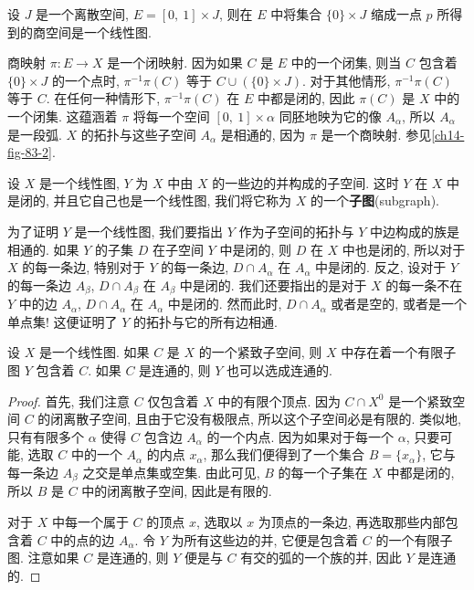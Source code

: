 \begin{example}[无限星是线性图]
\label{example:ch14-infinite-star}
设 $J$ 是一个离散空间, $E=[0,\ 1]\times J$, 则在 $E$ 中将集合 $\{0\}\times J$ 缩成一点 $p$ 所得到的商空间是一个线性图.

商映射 $\pi\colon E\to X$ 是一个闭映射. 因为如果 $C$ 是 $E$ 中的一个闭集, 则当 $C$ 包含着 $\{0\}\times J$ 的一个点时, $\pi^{-1}\pi(C)$ 等于 $C\cup(\{0\}\times J)$. 对于其他情形, $\pi^{-1}\pi(C)$ 等于 $C$. 在任何一种情形下, $\pi^{-1}\pi(C)$ 在 $E$ 中都是闭的, 因此 $\pi(C)$ 是 $X$ 中的一个闭集. 这蕴涵着 $\pi$ 将每一个空间 $[0,\ 1]\times\alpha$ 同胚地映为它的像 $A_{\alpha}$, 所以 $A_{\alpha}$ 是一段弧. $X$ 的拓扑与这些子空间 $A_{\alpha}$ 是相通的, 因为 $\pi$ 是一个商映射. 参见\cref{ch14-fig-83-2}.

\end{example}

\begin{definition}[子图]
\label{definition:ch14-subgraph}
设 $X$ 是一个线性图, $Y$ 为 $X$ 中由 $X$ 的一些边的并构成的子空间. 这时 $Y$ 在 $X$ 中是闭的, 并且它自己也是一个线性图, 我们将它称为 $X$ 的一个\textbf{子图}(subgraph).
\end{definition}

为了证明 $Y$ 是一个线性图, 我们要指出 $Y$ 作为子空间的拓扑与 $Y$ 中边构成的族是相通的. 如果 $Y$ 的子集 $D$ 在子空间 $Y$ 中是闭的, 则 $D$ 在 $X$ 中也是闭的, 所以对于 $X$ 的每一条边, 特别对于 $Y$ 的每一条边, $D\cap A_{\alpha}$ 在 $A_{\alpha}$ 中是闭的. 反之, 设对于 $Y$ 的每一条边 $A_{\beta}$, $D\cap A_{\beta}$ 在 $A_{\beta}$ 中是闭的. 我们还要指出的是对于 $X$ 的每一条不在 $Y$ 中的边 $A_{\alpha}$, $D\cap A_{\alpha}$ 在 $A_{\alpha}$ 中是闭的. 然而此时, $D\cap A_{\alpha}$ 或者是空的, 或者是一个单点集! 这便证明了 $Y$ 的拓扑与它的所有边相通.

\begin{lemma}[紧致子集含于有限子图]
\label{lemma:ch14-compact-finite-subgraph}
设 $X$ 是一个线性图. 如果 $C$ 是 $X$ 的一个紧致子空间, 则 $X$ 中存在着一个有限子图 $Y$ 包含着 $C$. 如果 $C$ 是连通的, 则 $Y$ 也可以选成连通的.
\end{lemma}

\begin{proof}
首先, 我们注意 $C$ 仅包含着 $X$ 中的有限个顶点. 因为 $C\cap X^{0}$ 是一个紧致空间 $C$ 的闭离散子空间, 且由于它没有极限点, 所以这个子空间必是有限的. 类似地, 只有有限多个 $\alpha$ 使得 $C$ 包含边 $A_{\alpha}$ 的一个内点. 因为如果对于每一个 $\alpha$, 只要可能, 选取 $C$ 中的一个 $A_{\alpha}$ 的内点 $x_{\alpha}$, 那么我们便得到了一个集合 $B=\{x_{\alpha}\}$, 它与每一条边 $A_{\beta}$ 之交是单点集或空集. 由此可见, $B$ 的每一个子集在 $X$ 中都是闭的, 所以 $B$ 是 $C$ 中的闭离散子空间, 因此是有限的.

对于 $X$ 中每一个属于 $C$ 的顶点 $x$, 选取以 $x$ 为顶点的一条边, 再选取那些内部包含着 $C$ 中的点的边 $A_{\alpha}$. 令 $Y$ 为所有这些边的并, 它便是包含着 $C$ 的一个有限子图. 注意如果 $C$ 是连通的, 则 $Y$ 便是与 $C$ 有交的弧的一个族的并, 因此 $Y$ 是连通的.
\end{proof}

